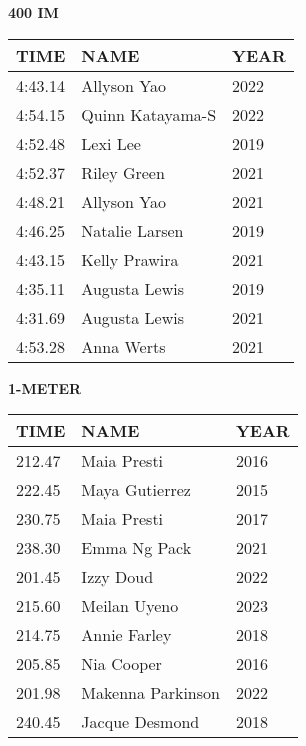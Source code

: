 \begin{center}
\begin{minipage}[t]{0.7\textwidth}
\centering
\textbf{400 IM}\\[0.05cm]
\begin{tabular}{@{}p{1.8cm}p{2.8cm}p{1.2cm}@{}}
\hline
\textbf{TIME} & \textbf{NAME} & \textbf{YEAR} \\
\hline
4:43.14 & Allyson Yao & 2022 \\
4:54.15 & Quinn Katayama-S & 2022 \\
4:52.48 & Lexi Lee & 2019 \\
4:52.37 & Riley Green & 2021 \\
4:48.21 & Allyson Yao & 2021 \\
4:46.25 & Natalie Larsen & 2019 \\
4:43.15 & Kelly Prawira & 2021 \\
4:35.11 & Augusta Lewis & 2019 \\
4:31.69 & Augusta Lewis & 2021 \\
4:53.28 & Anna Werts & 2021 \\
\hline
\end{tabular}
\end{minipage}
\end{center}

\vspace{0.4cm}

\begin{center}
\begin{minipage}[t]{0.7\textwidth}
\centering
\textbf{1-METER}\\[0.05cm]
\begin{tabular}{@{}p{1.8cm}p{2.8cm}p{1.2cm}@{}}
\hline
\textbf{TIME} & \textbf{NAME} & \textbf{YEAR} \\
\hline
212.47 & Maia Presti & 2016 \\
222.45 & Maya Gutierrez & 2015 \\
230.75 & Maia Presti & 2017 \\
238.30 & Emma Ng Pack & 2021 \\
201.45 & Izzy Doud & 2022 \\
215.60 & Meilan Uyeno & 2023 \\
214.75 & Annie Farley & 2018 \\
205.85 & Nia Cooper & 2016 \\
201.98 & Makenna Parkinson & 2022 \\
240.45 & Jacque Desmond & 2018 \\
\hline
\end{tabular}
\end{minipage}
\end{center}

